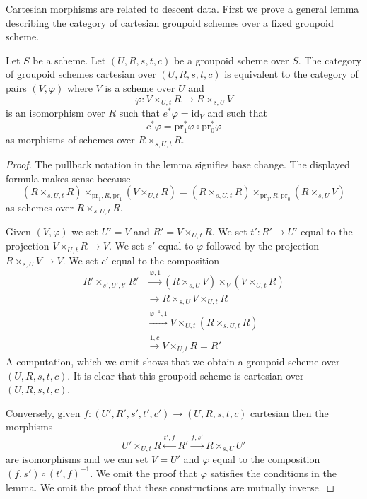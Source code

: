 \noindent
Cartesian morphisms are related to descent data. First we prove a general
lemma describing the category of cartesian groupoid schemes over a
fixed groupoid scheme.

\begin{lemma}
\label{lemma-characterize-cartesian-schemes}
Let $S$ be a scheme. Let $(U, R, s, t, c)$ be a groupoid scheme over $S$.
The category of groupoid schemes cartesian over $(U, R, s, t, c)$
is equivalent to the category of pairs $(V, \varphi)$ where $V$ is a
scheme over $U$ and
$$
\varphi :
V \times_{U, t} R
\longrightarrow
R \times_{s, U} V
$$
is an isomorphism over $R$ such that $e^*\varphi = \text{id}_V$ and such that
$$
c^*\varphi = \text{pr}_1^*\varphi \circ \text{pr}_0^*\varphi
$$
as morphisms of schemes over $R \times_{s, U, t} R$.
\end{lemma}

\begin{proof}
The pullback notation in the lemma signifies base change. The displayed
formula makes sense because
$$
(R \times_{s, U, t} R) \times_{\text{pr}_1, R, \text{pr}_1} (V \times_{U, t} R)
=
(R \times_{s, U, t} R) \times_{\text{pr}_0, R, \text{pr}_0} (R \times_{s, U} V)
$$
as schemes over $R \times_{s, U, t} R$.

\medskip\noindent
Given $(V, \varphi)$ we set $U' = V$ and $R' = V \times_{U, t} R$.
We set $t' : R' \to U'$ equal to the projection $V \times_{U, t} R \to V$.
We set $s'$ equal to $\varphi$ followed by the projection
$R \times_{s, U} V \to V$. We set $c'$ equal to the composition
\begin{align*}
R' \times_{s', U', t'} R'
& \xrightarrow{\varphi, 1}
(R \times_{s, U} V) \times_V (V \times_{U, t} R) \\
& \xrightarrow{}
R \times_{s, U} V \times_{U, t} R \\
& \xrightarrow{\varphi^{-1}, 1}
V \times_{U, t} (R \times_{s, U, t} R) \\
& \xrightarrow{1, c}
V \times_{U, t} R = R'
\end{align*}
A computation, which we omit shows that we obtain a groupoid scheme
over $(U, R, s, t, c)$. It is clear that this groupoid scheme is
cartesian over $(U, R, s, t, c)$.

\medskip\noindent
Conversely, given $f : (U', R', s', t', c') \to (U, R, s, t, c)$
cartesian then the morphisms
$$
U' \times_{U, t} R \xleftarrow{t', f} R' \xrightarrow{f, s'} R \times_{s, U} U'
$$
are isomorphisms and we can set $V = U'$ and $\varphi$ equal to the
composition $(f, s') \circ (t', f)^{-1}$. We omit the proof that
$\varphi$ satisfies the conditions in the lemma. We omit the proof that
these constructions are mutually inverse.
\end{proof}

